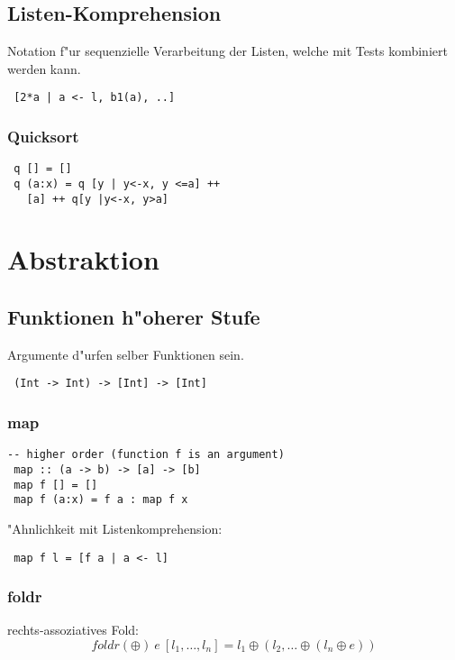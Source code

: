\documentclass[german,10pt, a4paper, twocolumn]{scrartcl}
\theoremstyle{definition}
\theoremstyle{remark}
\begin{document}
\subsection{Listen-Komprehension}

Notation f"ur sequenzielle Verarbeitung der Listen, welche mit Tests kombiniert werden kann.
\begin{verbatim}
 [2*a | a <- l, b1(a), ..]
\end{verbatim}

\subsubsection{Quicksort}

\begin{verbatim}
 q [] = []
 q (a:x) = q [y | y<-x, y <=a] ++
   [a] ++ q[y |y<-x, y>a]
\end{verbatim}

\section{Abstraktion}

\subsection{Funktionen h"oherer Stufe}

Argumente d"urfen selber Funktionen sein.
\begin{verbatim}
 (Int -> Int) -> [Int] -> [Int]
\end{verbatim}

\subsubsection{map}

\begin{verbatim}
-- higher order (function f is an argument)
 map :: (a -> b) -> [a] -> [b]
 map f [] = []
 map f (a:x) = f a : map f x
\end{verbatim}

"Ahnlichkeit mit Listenkomprehension:
\begin{verbatim}
 map f l = [f a | a <- l]
\end{verbatim}

\subsubsection{foldr}

rechts-assoziatives Fold:
\begin{displaymath}
	foldr (\oplus)\ e\ [l_1,\ldots,l_n] = l_1 \oplus (l_2,\ldots\oplus(l_n\oplus e))
\end{displaymath}
\end{document}

